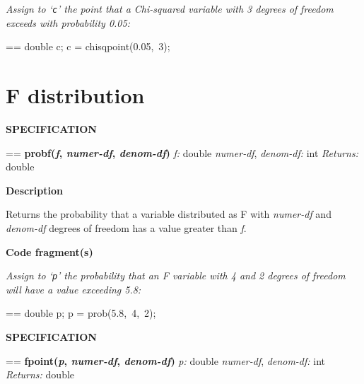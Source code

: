 \documentclass{book}
\makeatletter
\newcommand\Texinfocommandstyletextvar[1]{{\normalfont{}\textsl{#1}}}%
\newenvironment{Texinfopreformatted}{%
  \par\GNUTobeylines\obeyspaces\frenchspacing\parskip=\z@\parindent=\z@}{}
{\catcode`\^^M=13 \gdef\GNUTobeylines{\catcode`\^^M=13 \def^^M{\null\par}}}
\newenvironment{Texinfoindented}{\begin{list}{}{}\item\relax}{\end{list}}
\renewcommand{\_}{\Texinfounderscore\discretionary{}{}{}}
\makeatother
\begin{document}
\emph{Assign to `\texttt{c}' the point that
a Chi-squared variable with 3 degrees of freedom
exceeds with probability 0.05:}
\begin{Texinfoindented}
\begin{Texinfopreformatted}%
\ttfamily double c;
c = chisqpoint(0.05,\ 3);
\end{Texinfopreformatted}
\end{Texinfoindented}

\section{{F distribution}}
\label{anchor:F-distribution}%
%

\noindent{}\textbf{SPECIFICATION}
\begin{Texinfoindented}
\begin{Texinfopreformatted}%
\textbf{probf(\Texinfocommandstyletextvar{f}, \Texinfocommandstyletextvar{numer-df}, \Texinfocommandstyletextvar{denom-df})}
\Texinfocommandstyletextvar{f:} double
\Texinfocommandstyletextvar{numer-df}, \Texinfocommandstyletextvar{denom-df:} int
\Texinfocommandstyletextvar{Returns:} double
\end{Texinfopreformatted}
\end{Texinfoindented}

\noindent{}\textbf{Description}

Returns the probability that a variable distributed as F with
\Texinfocommandstyletextvar{numer-df} and \Texinfocommandstyletextvar{denom-df} degrees of freedom has a value greater than \Texinfocommandstyletextvar{f}.

\noindent{}\textbf{Code fragment(s)}

\emph{Assign to `\texttt{p}' the probability that an F variable with 4 and 2
degrees of freedom will have a value exceeding 5.8:}
\begin{Texinfoindented}
\begin{Texinfopreformatted}%
\ttfamily double p;
p = prob(5.8,\ 4,\ 2);
\end{Texinfopreformatted}
\end{Texinfoindented}

\noindent{}\textbf{SPECIFICATION}
\begin{Texinfoindented}
\begin{Texinfopreformatted}%
\textbf{fpoint(\Texinfocommandstyletextvar{p}, \Texinfocommandstyletextvar{numer-df}, \Texinfocommandstyletextvar{denom-df})}
\Texinfocommandstyletextvar{p:} double
\Texinfocommandstyletextvar{numer-df}, \Texinfocommandstyletextvar{denom-df:} int
\Texinfocommandstyletextvar{Returns:} double
\end{Texinfopreformatted}
\end{Texinfoindented}
\end{document}
